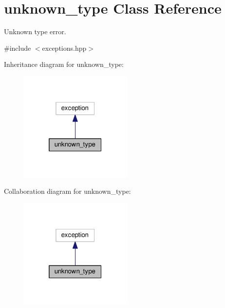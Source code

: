 \hypertarget{classunknown__type}{}\section{unknown\+\_\+type Class Reference}
\label{classunknown__type}


Unknown type error.  




{\ttfamily \#include $<$exceptions.\+hpp$>$}



Inheritance diagram for unknown\+\_\+type\+:\nopagebreak
\begin{figure}[H]
\begin{center}
\leavevmode
\includegraphics[width=160pt]{classunknown__type__inherit__graph}
\end{center}
\end{figure}


Collaboration diagram for unknown\+\_\+type\+:\nopagebreak
\begin{figure}[H]
\begin{center}
\leavevmode
\includegraphics[width=160pt]{classunknown__type__coll__graph}
\end{center}
\end{figure}
